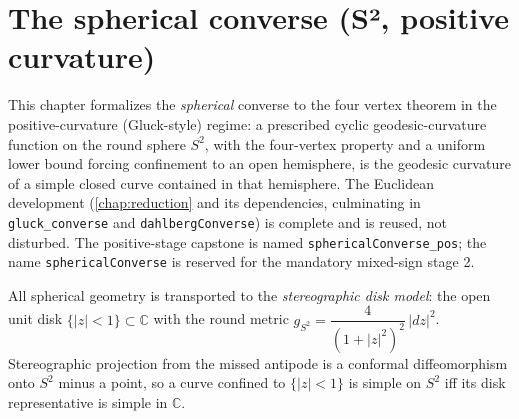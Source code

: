 \chapter{The spherical converse (S², positive curvature)}
\label{chap:sphere}

This chapter formalizes the \emph{spherical} converse to the four vertex theorem in
the positive-curvature (Gluck-style) regime: a prescribed cyclic geodesic-curvature
function on the round sphere $S^2$, with the four-vertex property and a uniform lower
bound forcing confinement to an open hemisphere, is the geodesic curvature of a simple
closed curve contained in that hemisphere. The Euclidean development
(\cref{chap:reduction} and its dependencies, culminating in \texttt{gluck\_converse} and
\texttt{dahlbergConverse}) is complete and is reused, not disturbed. The positive-stage
capstone is named \texttt{sphericalConverse\_pos}; the name \texttt{sphericalConverse} is
reserved for the mandatory mixed-sign stage 2.

All spherical geometry is transported to the \emph{stereographic disk model}: the open
unit disk $\{|z|<1\}\subset\mathbb C$ with the round metric
$g_{S^2}=\dfrac{4}{(1+|z|^2)^2}\,|dz|^2$. Stereographic projection from the missed
antipode is a conformal diffeomorphism onto $S^2$ minus a point, so a curve confined to
$\{|z|<1\}$ is simple on $S^2$ iff its disk representative is simple in $\mathbb C$.


